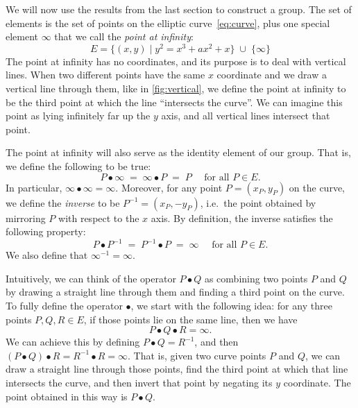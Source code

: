 \documentclass{article}
\begin{document}
We will now use the results from the last section to construct a group.
The set of elements is the set of points on the elliptic curve~\eqref{eq:curve}, plus one special element $\infty$ that we call the \emph{point at infinity}:
\begin{equation}
E = \{(x,y) \mid y^2 = x^3 + a x^2 + x\} \;\cup\; \{\infty\}
\end{equation}
The point at infinity has no coordinates, and its purpose is to deal with vertical lines.
When two different points have the same $x$ coordinate and we draw a vertical line through them, like in \autoref{fig:vertical}, we define the point at infinity to be the third point at which the line ``intersects the curve''.
We can imagine this point as lying infinitely far up the $y$ axis, and all vertical lines intersect that point.

The point at infinity will also serve as the identity element of our group.
That is, we define the following to be true:
\begin{equation}
P \bullet \infty \;=\; \infty \bullet P \;=\; P \quad\text{ for all } P \in E. \label{eq:law-identity}
\end{equation}
In particular, $\infty\bullet\infty=\infty$.
Moreover, for any point $P = (x_P, y_P)$ on the curve, we define the \emph{inverse} to be $P^{-1} = (x_P, -y_P)$, i.e.\ the point obtained by mirroring $P$ with respect to the $x$ axis.
By definition, the inverse satisfies the following property:
\begin{equation}
P \bullet P^{-1} \;=\; P^{-1} \bullet P \;=\; \infty \quad\text{ for all } P \in E. \label{eq:law-inverse}
\end{equation}
We also define that $\infty^{-1} = \infty$.

Intuitively, we can think of the operator $P \bullet Q$ as combining two points $P$ and $Q$ by drawing a straight line through them and finding a third point on the curve.
To fully define the operator $\bullet$, we start with the following idea: for any three points $P, Q, R \in E$, if those points lie on the same line, then we have
\begin{equation}
P \bullet Q \bullet R = \infty.
\end{equation}
We can achieve this by defining $P \bullet Q = R^{-1}$, and then $(P \bullet Q) \bullet R = R^{-1} \bullet R = \infty$.
That is, given two curve points $P$ and $Q$, we can draw a straight line through those points, find the third point at which that line intersects the curve, and then invert that point by negating its $y$ coordinate.
The point obtained in this way is $P \bullet Q$.
\end{document}

